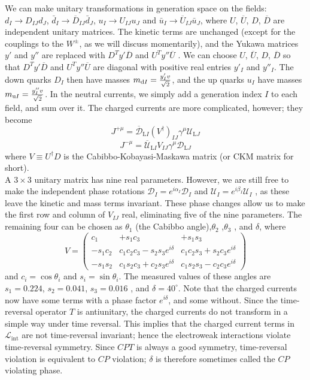 We can make unitary transformations in generation space on the fields: $d_I \to D_{IJ}d_J $, $\bar{d}_I \to \overline{D}_{IJ}\bar{d}_J$, $u_I \to U_{IJ}u_J $ and $\bar{u}_I \to \overline{U}_{IJ}\bar{u}_J$, where $U$, $\overline{U}$, $D$, $\overline{D}$ are independent unitary matrices. 
The kinetic terms are unchanged (except for the couplings to the $W^{\pm}$, as we will discuss momentarily), and the Yukawa matrices $y'$ and $y''$ are replaced with $D^T y' \overline{D}$  and $U^T y'' \overline{U}$ . We can choose
$U$, $\overline{U}$, $D$, $\overline{D}$ so that $D^T y' \overline{D}$  and $U^T y'' \overline{U}$ are diagonal with positive real entries $y'_I$ and $y''_I$. The down quarks $D_I$ then have masses $m_{{\rm d}I} = \frac{y'_I v}{\sqrt{2}}$,
and the up quarks $u_I$ have masses $m_{{\rm u}I} = \frac{y''_I v}{\sqrt{2}}$. In the neutral currents, we simply add a generation index $I$ to each field, and sum over it. 
The charged currents are more complicated, however; they become 
\[J^{+\mu} = \overline{\mathcal{D}}_{\mathrm{L}I} (V^{\dagger})_{IJ} \gamma^{\mu} \mathcal{U}_{\mathrm{L}J}\]
\[J^{-\mu} = \overline{\mathcal{U}}_{\mathrm{L}I} V_{IJ} \gamma^{\mu} \mathcal{D}_{\mathrm{L}J}\]
where $V \equiv U^{\dagger} D$ is the Cabibbo-Kobayasi-Maskawa matrix (or CKM matrix for short).
\\
A $3 \times 3$ unitary matrix has nine real parameters. However, we are still free to make the independent phase rotations $\mathcal{D}_I = e^{i\alpha_I} \mathcal{D}_I$ and $\mathcal{U}_I = e^{i\beta_I} \mathcal{U}_I$ , as
these leave the kinetic and mass terms invariant. These phase changes allow us to make the first row and column of $V_{IJ}$ real, eliminating five of the nine parameters. The remaining four can be chosen as $\theta_1$ (the Cabibbo angle),$\theta_2$ ,$\theta_3$ , and $\delta$, where
\[V = \begin{pmatrix}
c_1 & +s_1c_3 & +s_1s_3 \\
-s_1c_2 & c_1c_2c_3 - s_2s_3e^{i\delta} & c_1c_2s_3 + s_2c_3e^{i\delta} \\
-s_1s_2 & c_1s_2c_3 + c_2s_3e^{i\delta} & c_1s_2s_3- c_2c_3 e^{i\delta}
\end{pmatrix} \]
and $c_i = \cos\theta_i$ and $s_i = \sin\theta_i$. The measured values of these angles are $s_1=0.224$, $s_2 = 0.041$, $s_3 = 0.016$ , and $\delta = 40^{\circ}$. Note that the charged currents now have some terms with a phase factor $e^{i\delta}$, and some without. 
Since the time-reversal operator $T$ is antiunitary, the charged currents do not transform in a simple way under time reversal. This implies that the charged current terms in $\mathcal{L}_{\mathrm{int}}$ are not time-reversal invariant; hence the electroweak interactions violate time-reversal symmetry.
Since $CPT$ is always a good symmetry, time-reversal violation is equivalent to $CP$ violation; $\delta$ is therefore sometimes called the $CP$ violating phase.



